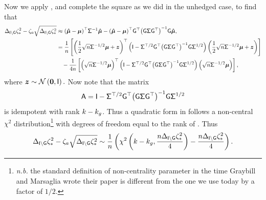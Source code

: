 \documentclass[10pt,a4paper,english]{article}
\theoremstyle{plain}
\theoremstyle{definition}
\theoremstyle{remark}
\begin{document}

Now we apply , and complete the square as we did in the unhedged case, to find that
{\scriptsize
\begin{align*}
  \Hejpsnrsqopt{\hejG} - \psnr[a]\sqrt{\Hejpsnrsqopt{\hejG}} 
  & \approx 
  \tr{\wrapParens{\svmu-\pvmu}}\minv{\pvsig}\svmu -
  \tr{\wrapParens{\svmu-\pvmu}}\tr{\hejG}
  \minv{\wrapParens{\qoform{\pvsig}{\hejG}}}\hejG\svmu,\\
  &=
  \oneby{\ssiz}
  \wrapBracks{
    \qform{\wrapParens{\eye - \trchol{\pvsig}\tr{\hejG}\minv{\wrapParens{\qoform{\pvsig}{\hejG}}}\hejG\chol{\pvsig}}}{%
      \wrapParens{\half\sqrt{\ssiz}\ichol{\pvsig}\pvmu + \vect{z}}}}\\
    &\phantom{=}\,
  -\oneby{4\ssiz}
  \wrapBracks{
    \qform{\wrapParens{\eye - \trchol{\pvsig}\tr{\hejG}\minv{\wrapParens{\qoform{\pvsig}{\hejG}}}\hejG\chol{\pvsig}}}{%
      \wrapParens{\sqrt{\ssiz}\ichol{\pvsig}\pvmu}}},
\end{align*}%
}%
where $\vect{z} \sim\normlaw{\vzero,\eye}.$
Now note that the matrix 
$$\Mtx{A} = {\eye - \trchol{\pvsig}\tr{\hejG}\minv{\wrapParens{\qoform{\pvsig}{\hejG}}}\hejG\chol{\pvsig}}$$
is idempotent with rank $\nstrat - \nstrathej$.
Thus a quadratic form in  follows a non-central $\chi^2$ distribution\footnote{\emph{n.b.} the standard definition of
non-centrality parameter in the time Graybill and Marsaglia wrote their paper is different from the one we use today by a factor of
$1/2$.} with degrees of freedom equal to the rank of . \cite[Theorem 2]{10.2307/2237227}
Thus
\begin{equation*}
\Hejpsnrsqopt{\hejG} - \psnr[a]\sqrt{\Hejpsnrsqopt{\hejG}} \sim
  \oneby{\ssiz}\wrapParens{\chisqlaw{\nstrat - \nstrathej,\frac{\ssiz\Hejpsnrsqopt{\hejG}}{4}} - \frac{\ssiz\Hejpsnrsqopt{\hejG}}{4}}.
\end{equation*}
\end{document}

